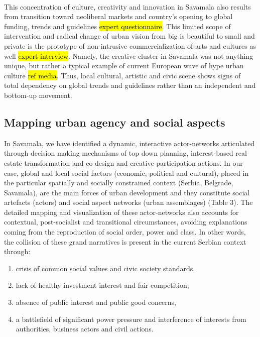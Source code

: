 \documentclass[11pt]{report}
\begin{document}
\\
This concentration of culture, creativity and innovation in Savamala also results from transition toward neoliberal markets and country's opening to global funding, trends and guidelines \hl{expert questionnaire}. This limited scope of intervention and radical change of urban vision from big is beautiful to small and private is the prototype of non-intrusive commercialization of arts and cultures as well \hl{expert interview}. Namely, the creative cluster in Savamala was not anything unique, but rather a typical example of current European wave of hype urban culture \hl{ref media}. Thus, local cultural, artistic and civic scene shows signs of total dependency on global trends and guidelines rather than an independent and bottom-up movement. 

\subsection{Mapping urban agency and social aspects}

In Savamala, we have identified a dynamic, interactive actor-networks articulated through decision making mechanisms of top down planning, interest-based real estate transformation and co-design and creative participation actions. In our case, global and local social factors (economic, political and cultural), placed in the particular spatially and socially constrained context (Serbia, Belgrade, Savamala), are the main forces of urban development and they constitute social artefacts (actors) and social aspect networks (urban assemblages) (Table 3). The detailed mapping and visualization of these actor-networks also accounts for contextual, post-socialist and transitional circumstances, avoiding explanations coming from the reproduction of social order, power and class.
In other words, the collision of these grand narratives is present in the current Serbian context through:
\begin{enumerate}
\item  crisis of common social values and civic society standards, 
\item lack of healthy investment interest and fair competition, 
\item absence of public interest and public good concerns, 
\item a battlefield of significant power pressure and interference of interests from authorities, business actors and civil actions.
\end{enumerate}
\end{document}
